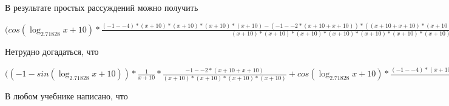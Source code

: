 \documentclass[12pt,a4paper,fleqn]{article}
\theoremstyle{definition}
\begin{document}
В результате простых рассуждений можно получить

$(cos(\log_{ 2.71828 }{ x  +  10 }) * \frac{( -1  -  -4 ) * ( x  +  10 ) * ( x  +  10 ) * ( x  +  10 ) * ( x  +  10 ) - ( -1  -  -2  * ( x  +  10  +  x  +  10 )) * (( x  +  10  +  x  +  10 ) * ( x  +  10 ) * ( x  +  10 ) + ( x  +  10 ) * ( x  +  10 ) * ( x  +  10  +  x  +  10 ))}{( x  +  10 ) * ( x  +  10 ) * ( x  +  10 ) * ( x  +  10 ) * ( x  +  10 ) * ( x  +  10 ) * ( x  +  10 ) * ( x  +  10 )}
 = cos(\log_{ 2.71828 }{ x  +  10 }) * \frac{( -1  -  -4 ) * ( x  +  10 ) * ( x  +  10 ) * ( x  +  10 ) * ( x  +  10 ) - ( -1  -  -2  * ( x  +  10  +  x  +  10 )) * (( x  +  10  +  x  +  10 ) * ( x  +  10 ) * ( x  +  10 ) + ( x  +  10 ) * ( x  +  10 ) * ( x  +  10  +  x  +  10 ))}{( x  +  10 ) * ( x  +  10 ) * ( x  +  10 ) * ( x  +  10 ) * ( x  +  10 ) * ( x  +  10 ) * ( x  +  10 ) * ( x  +  10 )}
$

Нетрудно догадаться, что

$(( -1  - sin(\log_{ 2.71828 }{ x  +  10 })) * \frac{ 1 }{ x  +  10 }
 * \frac{ -1  -  -2  * ( x  +  10  +  x  +  10 )}{( x  +  10 ) * ( x  +  10 ) * ( x  +  10 ) * ( x  +  10 )}
 + cos(\log_{ 2.71828 }{ x  +  10 }) * \frac{( -1  -  -4 ) * ( x  +  10 ) * ( x  +  10 ) * ( x  +  10 ) * ( x  +  10 ) - ( -1  -  -2  * ( x  +  10  +  x  +  10 )) * (( x  +  10  +  x  +  10 ) * ( x  +  10 ) * ( x  +  10 ) + ( x  +  10 ) * ( x  +  10 ) * ( x  +  10  +  x  +  10 ))}{( x  +  10 ) * ( x  +  10 ) * ( x  +  10 ) * ( x  +  10 ) * ( x  +  10 ) * ( x  +  10 ) * ( x  +  10 ) * ( x  +  10 )}
 = ( -1  - sin(\log_{ 2.71828 }{ x  +  10 })) * \frac{ 1 }{ x  +  10 }
 * \frac{ -1  -  -2  * ( x  +  10  +  x  +  10 )}{( x  +  10 ) * ( x  +  10 ) * ( x  +  10 ) * ( x  +  10 )}
 + cos(\log_{ 2.71828 }{ x  +  10 }) * \frac{( -1  -  -4 ) * ( x  +  10 ) * ( x  +  10 ) * ( x  +  10 ) * ( x  +  10 ) - ( -1  -  -2  * ( x  +  10  +  x  +  10 )) * (( x  +  10  +  x  +  10 ) * ( x  +  10 ) * ( x  +  10 ) + ( x  +  10 ) * ( x  +  10 ) * ( x  +  10  +  x  +  10 ))}{( x  +  10 ) * ( x  +  10 ) * ( x  +  10 ) * ( x  +  10 ) * ( x  +  10 ) * ( x  +  10 ) * ( x  +  10 ) * ( x  +  10 )}
$

В любом учебнике написано, что
\end{document}
